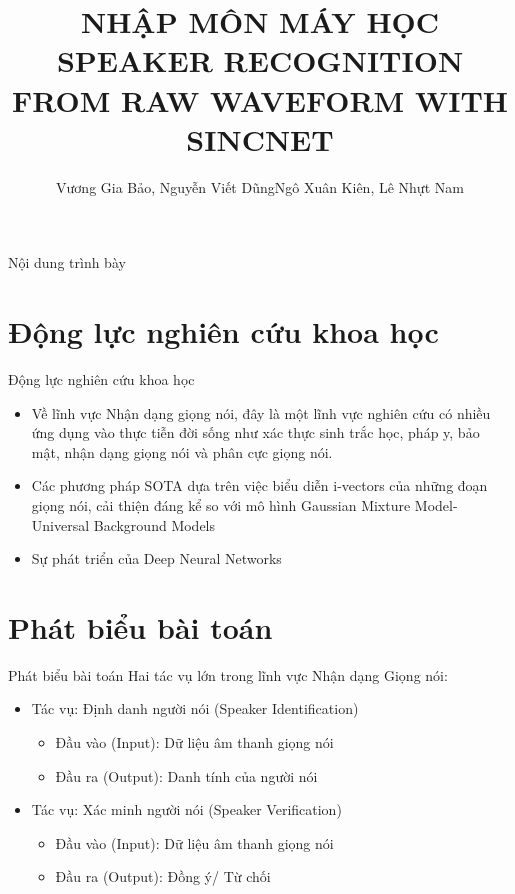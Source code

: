 \documentclass[11pt]{beamer}
\author{Vương Gia Bảo, Nguyễn Viết Dũng\newline Ngô Xuân Kiên, Lê Nhựt Nam}
\title{NHẬP MÔN MÁY HỌC \newline SPEAKER RECOGNITION FROM \newline RAW WAVEFORM WITH SINCNET}
\institute{Đại học Khoa học Tự nhiên, Đại học Quốc gia TP HCM}
\begin{document}
\begin{frame}
\titlepage
\end{frame}

\begin{frame}{Nội dung trình bày}
\tableofcontents
\end{frame}


\section{Động lực nghiên cứu khoa học}
\begin{frame}{Động lực nghiên cứu khoa học}
	\begin{itemize}
		\item Về lĩnh vực Nhận dạng giọng nói, đây là một lĩnh vực nghiên cứu có nhiều ứng dụng vào thực tiễn đời sống như xác thực sinh trắc học, pháp y, bảo mật, nhận dạng giọng nói và phân cực giọng nói.
		\item Các phương pháp SOTA dựa trên việc biểu diễn i-vectors của những đoạn
		giọng nói, cải thiện đáng kể so với mô hình Gaussian Mixture Model-Universal Background Models
		\item Sự phát triển của Deep Neural Networks
	\end{itemize}
\end{frame}

\section{Phát biểu bài toán}
\begin{frame}{Phát biểu bài toán}
	Hai tác vụ lớn trong lĩnh vực Nhận dạng Giọng nói:\newline
	\begin{itemize}
		\item Tác vụ: Định danh người nói (Speaker Identification)
		\begin{itemize}
			\item Đầu vào (Input): Dữ liệu âm thanh giọng nói
			\item Đầu ra (Output): Danh tính của người nói
		\end{itemize}
		\item 	Tác vụ: Xác minh người nói (Speaker Verification)
		\begin{itemize}
			\item Đầu vào (Input): Dữ liệu âm thanh giọng nói
			\item Đầu ra (Output): Đồng ý/ Từ chối
		\end{itemize}
	\end{itemize}
\end{frame}
\end{document}
